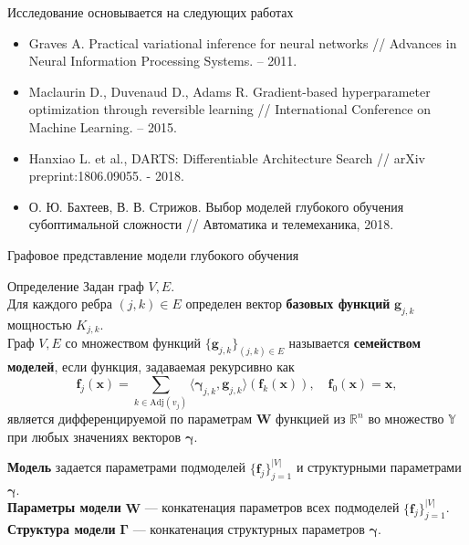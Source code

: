 \documentclass[usenames,dvipsnames,11pt,pdf,utf8,russian,aspectratio=169]{beamer}
\begin{document}

\begin{frame}{Исследование основывается на следующих работах}
\begin{itemize}
\item Graves A. Practical variational inference for neural networks // Advances in Neural Information Processing Systems. – 2011.
\item  Maclaurin D., Duvenaud D., Adams R. Gradient-based hyperparameter optimization through reversible learning // International Conference on Machine Learning. – 2015.
\item Hanxiao L. et al., DARTS: Differentiable Architecture Search //  arXiv preprint:1806.09055. - 2018.
\item О. Ю. Бахтеев, В. В. Стрижов. Выбор моделей глубокого обучения субоптимальной сложности  // Автоматика и телемеханика, 2018.
\end{itemize}
\end{frame}


\begin{frame}{Графовое представление модели глубокого обучения}
\begin{block}{Определение}
Задан граф $V,E$. \\
Для каждого ребра $(j,k) \in E$ определен вектор \textbf{базовых функций} $\mathbf{g}_{j,k}$ мощностью $K_{j,k}$.\\
Граф $V, E$ со множеством функций $\{\mathbf{g}_{j,k}\}_{(j,k) \in E}$ называется \textbf{семейством моделей}, если функция, задаваемая рекурсивно как 
\[
    \mathbf{f}_j(\mathbf{x}) = \sum_{k \in \text{Adj}(v_j)} \langle \boldsymbol{\gamma}_{j,k}, \mathbf{g}_{j,k} \rangle \left(\mathbf{f}_{k}(\mathbf{x})\right), \quad     \mathbf{f}_0(\mathbf{x}) = \mathbf{x},
\]
является дифференцируемой по параметрам $\mathbf{W}$ функцией из $\mathbb{R}^n$ во множество $\mathbb{Y}$ при любых значениях векторов $\boldsymbol{\gamma}$.
\end{block}
\textbf{Модель} задается параметрами подмоделей $\{\mathbf{f}_j\}_{j=1}^{|V|}$ и структурными параметрами  $\boldsymbol{\gamma}$.\\
\textbf{Параметры модели}  $\mathbf{W}$ ---  конкатенация параметров всех подмоделей $\{\mathbf{f}_j\}_{j=1}^{|V|}$.\\
\textbf{Структура модели}  $\boldsymbol{\Gamma}$ --- конкатенация структурных параметров $\boldsymbol{\gamma}$.
\end{frame}
\end{document}
